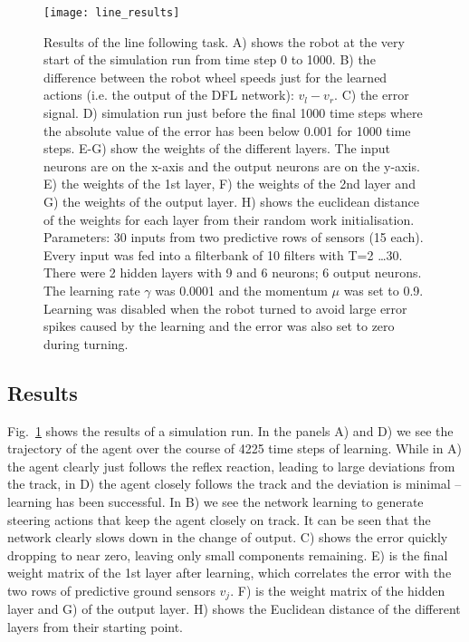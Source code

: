 \documentclass{aamas2018}
\begin{document}
\begin{figure}[!ht]
  \centering
  \texttt{[image: line\_results]}
  \caption{Results of the line following task. A) shows the robot at
    the very start of the simulation run from time step 0 to 1000. B)
    the difference between the robot wheel speeds just for the learned
    actions (i.e. the output of the DFL network): $v_l-v_r$.  C) the
    error signal.  D) simulation run just before the final 1000 time
    steps where the absolute value of the error has been below 0.001
    for 1000 time steps. E-G) show the weights of the different
    layers. The input neurons are on the x-axis and the output neurons
    are on the y-axis.  E) the weights of the 1st layer, F) the
    weights of the 2nd layer and G) the weights of the output layer.
    H) shows the euclidean distance of the weights for each layer from
    their random work initialisation. Parameters: 30 inputs from two
    predictive rows of sensors (15 each). Every input was fed into a
    filterbank of 10 filters with T=2 \ldots 30. There were 2 hidden
    layers with 9 and 6 neurons; 6 output neurons. The learning rate $\gamma$
    was 0.0001 and the momentum $\mu$ was set to 0.9. Learning was disabled
    when the robot turned to avoid large error spikes caused by the learning
    and the error was also set to zero during turning.
    \label{line_results}}
\end{figure}



\subsection{Results}
Fig.~\ref{line_results} shows the results of a simulation run. In the
panels A) and D) we see the trajectory of the agent over the course of
4225 time steps of learning. While in A) the agent clearly just
follows the reflex reaction, leading to large deviations from the
track, in D) the agent closely follows the track and the deviation is
minimal -- learning has been successful. In B) we see the network
learning to generate steering actions that keep the agent closely on track.
It can be seen that the network clearly slows down in the change of
output.  C) shows the error quickly dropping to near zero, leaving
only small components remaining. E) is the final weight matrix of the
1st layer after learning, which correlates the error with the two rows
of predictive ground sensors $v_j$. F) is the weight matrix of the
hidden layer and G) of the output layer. H) shows the Euclidean
distance of the different layers from their starting point.
\end{document}
